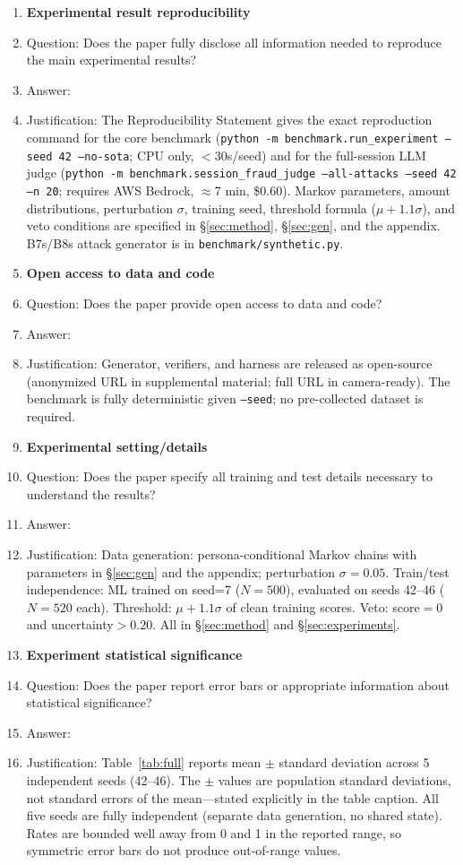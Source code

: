 \begin{enumerate}
\item {\bf Experimental result reproducibility}
    \item[] Question: Does the paper fully disclose all information needed to reproduce the main experimental results?
    \item[] Answer: \answerYes{}
    \item[] Justification: The Reproducibility Statement gives the exact reproduction command for the core benchmark (\texttt{python -m benchmark.run\_experiment --seed 42 --no-sota}; CPU only, $<$30s/seed) and for the full-session LLM judge (\texttt{python -m benchmark.session\_fraud\_judge --all-attacks --seed 42 --n 20}; requires AWS Bedrock, $\approx$7 min, \$0.60). Markov parameters, amount distributions, perturbation $\sigma$, training seed, threshold formula ($\mu + 1.1\sigma$), and veto conditions are specified in \S\ref{sec:method}, \S\ref{sec:gen}, and the appendix. B7s/B8s attack generator is in \texttt{benchmark/synthetic.py}.

\item {\bf Open access to data and code}
    \item[] Question: Does the paper provide open access to data and code?
    \item[] Answer: \answerYes{}
    \item[] Justification: Generator, verifiers, and harness are released as open-source (anonymized URL in supplemental material; full URL in camera-ready). The benchmark is fully deterministic given \texttt{--seed}; no pre-collected dataset is required.

\item {\bf Experimental setting/details}
    \item[] Question: Does the paper specify all training and test details necessary to understand the results?
    \item[] Answer: \answerYes{}
    \item[] Justification: Data generation: persona-conditional Markov chains with parameters in \S\ref{sec:gen} and the appendix; perturbation $\sigma=0.05$. Train/test independence: ML trained on seed=7 ($N=500$), evaluated on seeds 42--46 ($N=520$ each). Threshold: $\mu+1.1\sigma$ of clean training scores. Veto: score$=0$ and uncertainty$>0.20$. All in \S\ref{sec:method} and \S\ref{sec:experiments}.

\item {\bf Experiment statistical significance}
    \item[] Question: Does the paper report error bars or appropriate information about statistical significance?
    \item[] Answer: \answerYes{}
    \item[] Justification: Table~\ref{tab:full} reports mean $\pm$ standard deviation across 5 independent seeds (42--46). The $\pm$ values are population standard deviations, not standard errors of the mean---stated explicitly in the table caption. All five seeds are fully independent (separate data generation, no shared state). Rates are bounded well away from 0 and 1 in the reported range, so symmetric error bars do not produce out-of-range values.


\end{enumerate}
